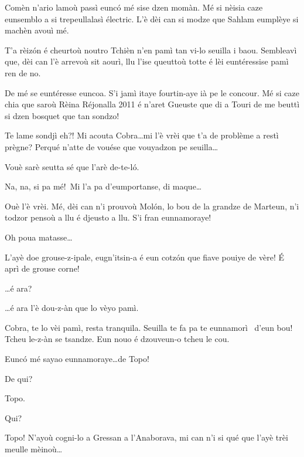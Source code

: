 \begin{drama}
\Piccinaspeaks Comèn n’ario lamoù passì eunc\'o mé sise dzen momàn. Mé si nèisia caze eunsemblo a si trepeullalasì électric. L’è dèi can si modze que Sahlam eumplèye si machèn avouì mé.

\Tzardounspeaks T’a rèiz\'on é cheurtoù noutro Tchièn n’en pamì tan vi-lo seuilla i baou. Sembleavì que, dèi can l'è arrevoù sit aourì, llu l'ise queuttoù totte é lèi euntéressise pamì ren de no.

\Cobraspeaks De mé se euntéresse euncoa. S’i jamì itaye fourtin-aye ià pe le concour. Mé si caze chia que saroù Rèina Réjonalla 2011 é n’aret Gueuste que di a Touri de me beuttì si dzen bosquet que tan sondzo!

\Tzardounspeaks Te lame sondjì eh?!  Mi acouta Cobra\ldots mi l’è vrèi que t’a de problème a restì prègne? Perqué n’atte de vouése que vouyadzon pe seuilla\ldots


\Cobraspeaks Vouè sarè seutta sé que l’arè de-te-l\'o.

\Piccinaspeaks Na, na, si pa mé!\imbarazzatoo\ Mi l’a pa d'eumportanse, di maque\ldots

\Cobraspeaks Ouè l’è vrèi. Mé, dèi can n’i prouvoù Mol\'on, lo bou de la grandze de Marteun, n’i todzor pensoù a llu é djeusto a llu. S’i fran eunnamoraye!

\Piccinaspeaks Oh poua matasse\ldots

\Cobraspeaks  L’ayè doe grouse-z-ipale, eugn'itsin-a é eun cotz\'on que fiave pouiye de vère! \'E aprì de grouse corne!

\Piccinaspeaks \ldots é ara?

\Cobraspeaks \ldots é ara l’è dou-z-àn que lo vèyo pamì.

\Tzardounspeaks Cobra, te lo vèi pamì, resta tranquila. Seuilla te fa pa te eunnamorì \inamourou\ d’eun bou! Tcheu le-z-àn se tsandze. Eun nouo é dzouveun-o tcheu le cou.

\Piccinaspeaks Eunc\'o mé sayao eunnamoraye\ldots de Topo!

\Tzardounspeaks De qui?

\Piccinaspeaks Topo.

\Tzardounspeaks Qui?

\Piccinaspeaks {} Topo! N’ayoù cogni-lo a Gressan a l’Anaborava, mi can n'i si qué que l’ayè trèi meulle mèinoù\ldots


\end{drama}
